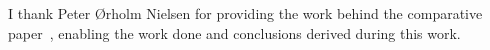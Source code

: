 
I thank Peter Ørholm Nielsen for providing the work behind the comparative 
paper~\cite*{peter}, enabling the work done and conclusions derived during this work.
 
